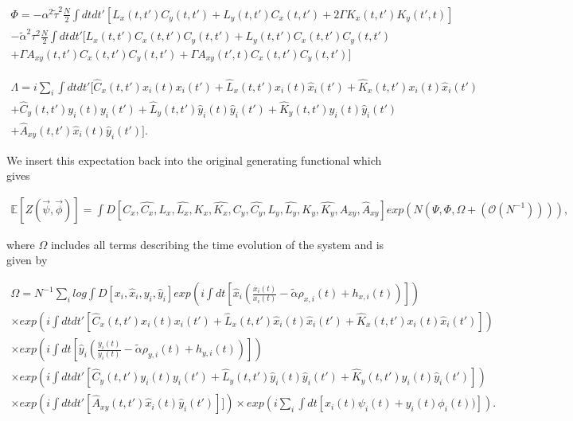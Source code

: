 \documentclass{article}
\begin{document}
\begin{equation}
	\begin{split}
		\Phi = - \alpha^2 \tilde{\tau}^2 \frac{N}{2} \int dt dt'[L_x(t, t')C_y(t, t')
		+ L_y(t, t')C_x(t, t') + 2 \Gamma K_x(t, t') K_y(t', t)] \\
	- \tilde{\alpha}^2 \tau^2 \frac{N}{2} \int dtdt' [L_x(t, t') C_x(t, t') C_y(t, t') + L_y(t, t')
	C_x(t, t') C_y(t, t') \\ + \Gamma A_{xy}(t, t') C_x(t, t') C_y(t, t') + \Gamma A_{xy}(t', t) C_x
	(t, t') C_y(t, t')] 
\end{split}
\end{equation}

\begin{equation}
	\begin{split}
		\Lambda = i \sum_i \int dt dt'[\hat{C}_x(t, t') x_i(t) x_i(t') + \hat{L}_x(t, t') \hat{x}_i
		(t)\hat{x}_i(t') + \hat{K}_x(t, t') x_i(t) \hat{x}_i(t') \\ + \hat{C}_y(t, t') y_i(t) y_i
		(t') +
		\hat{L}_y(t, t') \hat{y}_i
		(t)\hat{y}_i(t') + \hat{K}_y(t, t') y_i(t) \hat{y}_i(t') \\ 
		+ \hat{A}_{xy}(t, t') \hat{x}_i(t) \hat{y}_i(t')].
	\end{split}
\end{equation}

We insert this expectation back into the original generating functional which gives

\begin{equation}
	\begin{split}
		\mathbb{E}[Z(\Vec{\psi}, \Vec{\phi})] = \int D[C_x, \hat{C_x}, L_x, \hat{L_x}, K_x, 
		\hat{K_x}, C_y, \hat{C_y}, L_y, \hat{L_y}, K_y, 
		\hat{K_y}, A_{xy}, \hat{A}_{xy}] 
		exp(N(\Psi, \Phi, \Omega + (\mathcal{O}(N^{-1})))),
	\end{split}
\end{equation}

where $\Omega$ includes all terms describing the time evolution of the system and is given by

\begin{equation}
	\begin{split}
		\Omega = N^{-1} \sum_i log \int D[x_i, \hat{x}_i, y_i, \hat{y}_i] exp(i
		\int dt[\hat{x}_i
		(\frac{\dot{x_i}(t)}{x_i(t)}
			- \tilde{\alpha} \rho_{x, i}(t) + h_{x, i}(t))]) 
			\\
		\times exp(i\int dt dt'[\hat{C}_x(t, t') x_i(t) x_i(t') + \hat{L}_x(t, t') \hat{x}_i
		(t)\hat{x}_i(t') + \hat{K}_x(t, t') x_i(t) \hat{x}_i(t')])\\
		\times exp(i \int dt[\hat{y}_i
		(\frac{\dot{y_i}(t)}{y_i(t)} 
			- \tilde{\alpha} \rho_{y, i}(t) + h_{y, i}(t))])\\
		\times exp(i \int dt dt' [\hat{C}_y(t, t') y_i(t) y_i
		(t') +
		\hat{L}_y(t, t') \hat{y}_i
		(t)\hat{y}_i(t') + \hat{K}_y(t, t') y_i(t) \hat{y}_i(t')])\\
		\times exp(i \int dt dt'[\hat{A}_{xy}(t, t') \hat{x}_i(t) \hat{y}_i(t')]])
			\times exp(i \sum_i
		\int dt[x_i(t) \psi_i(t) + y_i(t) \phi_i(t))]).
	\end{split}
\end{equation}
\end{document}
